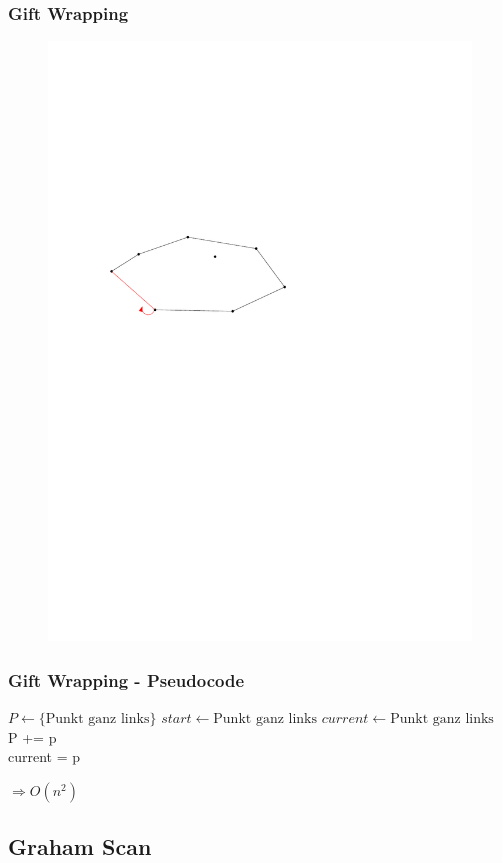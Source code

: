 \begin{frame}
	\frametitle{{Gift Wrapping}}
\begin{figure}[htbp]
	\begin{center}
  	\includegraphics[width=.8\linewidth]{bilder/giftwrap7}
	\end{center}
\end{figure}
\end{frame}


\begin{frame}
	\frametitle{{Gift Wrapping - Pseudocode}}
	\begin{algorithmic}
\State $P\gets \{\mbox{Punkt ganz links}\}$
\State $start\gets \mbox{Punkt ganz links}$
\State $current\gets \mbox{Punkt ganz links}$
\\
\Repeat 
			P += p\\
			current = p
		\EndIf
	\EndFor
{}
\end{algorithmic}
$\Rightarrow O(n^2)$
\end{frame}

\subsection{Graham Scan}

